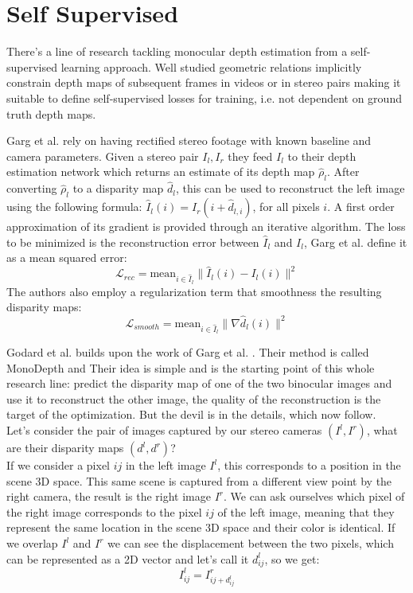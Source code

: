 
\section{Self Supervised}
There's a line of research tackling monocular depth estimation from a self-supervised learning approach.
Well studied geometric relations implicitly constrain depth maps of subsequent frames in videos or in stereo pairs making it suitable to define self-supervised losses for training, i.e. not dependent on ground truth depth maps.

Garg et al. \cite{Garg} rely on having rectified stereo footage with known baseline and camera parameters.
Given a stereo pair $I_{l}, I_{r}$ they feed $I_{l}$ to their depth estimation network which returns an estimate of its depth map $\hat{\rho}_{l}$.
After converting $\hat{\rho}_{l}$ to a disparity map $\hat{d}_{l}$, this can be used to reconstruct the left image using the following formula: $\hat{I}_{l} (i) = I_{r} (i + \hat{d}_{l, i})$, for all pixels $i$. A first order approximation of its gradient is provided through an iterative algorithm.
The loss to be minimized is the reconstruction error between $\hat{I}_{l}$ and $I_{l}$, Garg et al. define it as a mean squared error:
\[
	\mathcal{L}_{rec} = \text{mean}_{i \in \hat{I}_{l}} \big\| \hat{I}_{l}(i) - I_{l}(i) \big\|^{2}
\]
The authors also employ a regularization term that smoothness the resulting disparity maps:
\[
	\mathcal{L}_{smooth} = \text{mean}_{i \in \hat{I}_{l}} \big\| \nabla \hat{d}_{l} (i) \big\|^{2}
\]


Godard et al. \cite{MonoDepth} builds upon the work of Garg et al. \cite{Garg}. Their method is called MonoDepth and  Their idea is simple and is the starting point of this whole research line: predict the disparity map of one of the two binocular images and use it to reconstruct the other image, the quality of the reconstruction is the target of the optimization. But the devil is in the details, which now follow.\\

Let's consider the pair of images captured by our stereo cameras $(I^{l}, I^{r})$, what are their disparity maps $(d^{l}, d^{r})$?\\
If we consider a pixel $ij$ in the left image $I^{l}$, this corresponds to a position in the scene 3D space. This same scene is captured from a different view point by the right camera, the result is the right image $I^{r}$. We can ask ourselves which pixel of the right image corresponds to the pixel $ij$ of the left image, meaning that they represent the same location in the scene 3D space and their color is identical. If we overlap $I^{l}$ and $I^{r}$ we can see the displacement between the two pixels, which can be represented as a 2D vector and let's call it $d^{l}_{ij}$, so we get:
\[
	I^{l}_{ij} = I^{r}_{ij + d^{l}_{ij}}
\]

